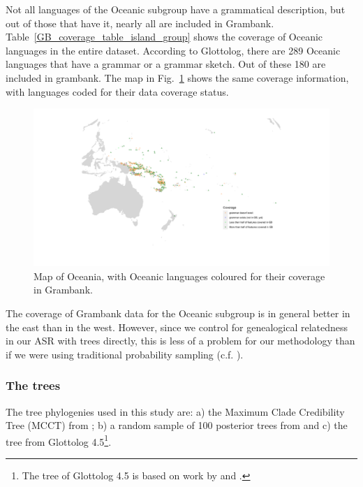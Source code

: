 \documentclass[12pt,letterpaper]{article}
\begin{document}
Not all languages of the Oceanic subgroup have a grammatical description, but out of those that have it, nearly all are included in Grambank. Table~\ref{GB_coverage_table_island_group} shows the coverage of Oceanic languages in the entire dataset. According to Glottolog, there are 289 Oceanic languages that have a grammar or a grammar sketch. Out of these 180 are included in grambank. The map in Fig.~\ref{GB_austro_coverage} shows the same coverage information, with languages coded for their data coverage status.



\begin{figure}
\centering
\includegraphics[width=\textwidth]{illustrations/plots_from_R/coverage_plots/maps/coverage_map_oceanic.png}
\caption{Map of Oceania, with Oceanic languages coloured for their coverage in Grambank.}
\label{GB_austro_coverage}
\end{figure} %

The coverage of Grambank data for the Oceanic subgroup is in general better in the east than in the west. However, since we control for genealogical relatedness in our ASR with trees directly, this is less of a problem for our methodology than if we were using traditional probability sampling (c.f. \citet{ross2004morphosyntactic}).

\FloatBarrier
\subsubsection{The trees}
\label{the_trees}
The tree phylogenies used in this study are: a) the Maximum Clade Credibility Tree (MCCT) from \citet{grayetal_2009}; b) a random sample of 100 posterior trees from \citet{grayetal_2009} and c) the tree from Glottolog 4.5\footnote{The tree of Glottolog 4.5 \citep{glottolog4_5} is based on work by \citet{blust_2009, blust_2014} and \citet{blust_chen_2017}.}. 
\end{document}
